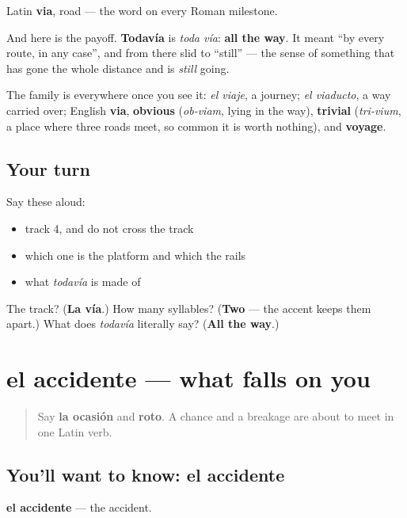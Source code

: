 \begin{cousinweb}
Latin \textbf{via}, road — the word on every Roman milestone.

And here is the payoff. \textbf{Todavía} is \emph{toda vía}: \textbf{all the way}. It meant \textquotedblleft{}by every route, in any case\textquotedblright{}, and from there slid to \textquotedblleft{}still\textquotedblright{} — the sense of something that has gone the whole distance and is \emph{still} going.

The family is everywhere once you see it: \emph{el viaje}, a journey; \emph{el viaducto}, a way carried over; English \textbf{via}, \textbf{obvious} (\emph{ob-viam}, lying in the way), \textbf{trivial} (\emph{tri-vium}, a place where three roads meet, so common it is worth nothing), and \textbf{voyage}.
\end{cousinweb}

\subsection*{Your turn}
Say these aloud:

\begin{itemize}
\raggedright
  \item track 4, and do not cross the track
  \item which one is the platform and which the rails
  \item what \emph{todavía} is made of
\end{itemize}

\begin{tcolorbox}[breakable,colback=teal!4,colframe=teal!35!black,title={Before you move on}]
The track? (\textbf{La vía}.) How many syllables? (\textbf{Two} — the accent keeps them apart.) What does \emph{todavía} literally say? (\textbf{All the way}.)
\end{tcolorbox}
\section[el accidente]{el accidente — what falls on you}

\label{lesson:ES-C454-accidente}



\begin{quote}
Say \textbf{la ocasión} and \textbf{roto}. A chance and a breakage are about to meet in one Latin verb.
\end{quote}

\subsection*{You'll want to know: el accidente}
\textbf{el accidente} — the accident.

